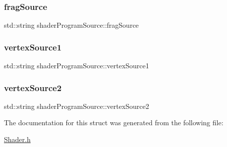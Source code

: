 \subsubsection{\texorpdfstring{frag\+Source}{fragSource}}
{\footnotesize\ttfamily std\+::string shader\+Program\+Source\+::frag\+Source}

\mbox{\label{structshader_program_source_a32a8a4f7abe96ffe574ab0f77b070e31}} 
\subsubsection{\texorpdfstring{vertex\+Source1}{vertexSource1}}
{\footnotesize\ttfamily std\+::string shader\+Program\+Source\+::vertex\+Source1}

\mbox{\label{structshader_program_source_ace1d4cf682aaa7b3bf838f48da9ec502}} 
\subsubsection{\texorpdfstring{vertex\+Source2}{vertexSource2}}
{\footnotesize\ttfamily std\+::string shader\+Program\+Source\+::vertex\+Source2}



The documentation for this struct was generated from the following file\+:\begin{DoxyCompactItemize}
\item 
\mbox{\hyperlink{_shader_8h}{Shader.\+h}}\end{DoxyCompactItemize}
